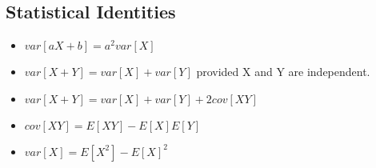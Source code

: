 
\subsection{Statistical Identities}

\begin{itemize}
\item $ var[aX+b] =a^2var[X]$

\item $ var[X+Y] =var[X] +var[Y] $ provided X and Y are independent.

\item $ var[X+Y] =var[X] +var[Y] + 2cov[XY]  $

\item $ cov[XY] = E[XY] - E[X]E[Y]$

\item $ var[X] =E[X^2] -E[X]^2$
\end{itemize}

